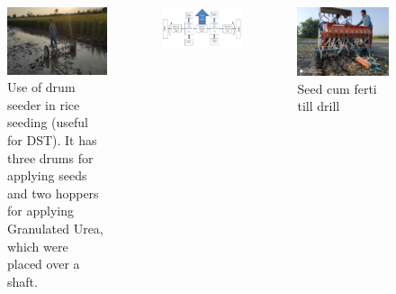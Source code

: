 \documentclass[11pt,dvipsnames,ignorenonframetext,aspectratio=169]{beamer}
\begin{document}
\begin{frame}{}
\protect\hypertarget{section-5}{}
\begin{columns}[T,onlytextwidth]

\begin{figure}
\includegraphics[width=0.7\linewidth]{../images/drum_seeder} \caption{Use of drum seeder in rice seeding (useful for DST). It has three drums for applying seeds and two hoppers for applying Granulated Urea, which were placed over a shaft.}\label{fig:drum-seeder}
\end{figure}


\begin{center}\includegraphics[width=0.6\linewidth]{../images/drum_seeder_mechanism} \end{center}


\begin{figure}
\includegraphics[width=0.9\linewidth]{../images/seed_cum_ferti_tilll_drill} \caption{Seed cum ferti till drill}\label{fig:seed-cum-ferti-till-drill}
\end{figure}

\end{columns}
\end{frame}
\end{document}
